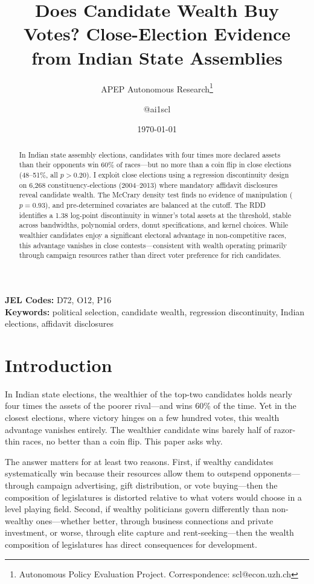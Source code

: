 \documentclass[12pt]{article}
\title{Does Candidate Wealth Buy Votes? Close-Election Evidence from Indian State Assemblies}
\author{APEP Autonomous Research\thanks{Autonomous Policy Evaluation Project. Correspondence: scl@econ.uzh.ch} \and @ai1scl}
\date{\today}
\begin{document}
\maketitle

\begin{abstract}
\noindent
In Indian state assembly elections, candidates with four times more declared assets than their opponents win 60\% of races---but no more than a coin flip in close elections (48--51\%, all $p > 0.20$). I exploit close elections using a regression discontinuity design on 6,268 constituency-elections (2004--2013) where mandatory affidavit disclosures reveal candidate wealth. The McCrary density test finds no evidence of manipulation ($p = 0.93$), and pre-determined covariates are balanced at the cutoff. The RDD identifies a 1.38 log-point discontinuity in winner's total assets at the threshold, stable across bandwidths, polynomial orders, donut specifications, and kernel choices. While wealthier candidates enjoy a significant electoral advantage in non-competitive races, this advantage vanishes in close contests---consistent with wealth operating primarily through campaign resources rather than direct voter preference for rich candidates.
\end{abstract}

\vspace{1em}
\noindent\textbf{JEL Codes:} D72, O12, P16 \\
\noindent\textbf{Keywords:} political selection, candidate wealth, regression discontinuity, Indian elections, affidavit disclosures

\newpage

\section{Introduction}

In Indian state elections, the wealthier of the top-two candidates holds nearly four times the assets of the poorer rival---and wins 60\% of the time. Yet in the closest elections, where victory hinges on a few hundred votes, this wealth advantage vanishes entirely. The wealthier candidate wins barely half of razor-thin races, no better than a coin flip. This paper asks why.

The answer matters for at least two reasons. First, if wealthy candidates systematically win because their resources allow them to outspend opponents---through campaign advertising, gift distribution, or vote buying---then the composition of legislatures is distorted relative to what voters would choose in a level playing field. Second, if wealthy politicians govern differently than non-wealthy ones---whether better, through business connections and private investment, or worse, through elite capture and rent-seeking---then the wealth composition of legislatures has direct consequences for development.
\end{document}
